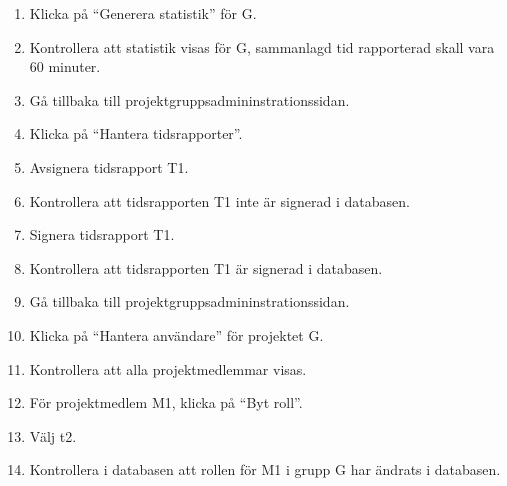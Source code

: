 \documentclass[a4paper]{article}
\begin{document}
\begin{FT}
\begin{enumerate}
\item Klicka på ``Generera statistik'' för G.
\item Kontrollera att statistik visas för G, sammanlagd tid rapporterad skall vara 60 minuter.
\item Gå tillbaka till projektgruppsadmininstrationssidan.
\item Klicka på ``Hantera tidsrapporter''.
\item Avsignera tidsrapport T1.
\item Kontrollera att tidsrapporten T1 inte är signerad i databasen.
\item Signera tidsrapport T1.
\item Kontrollera att tidsrapporten T1 är signerad i databasen.
\item Gå tillbaka till projektgruppsadmininstrationssidan.
\item Klicka på ``Hantera användare'' för projektet G.
\item Kontrollera att alla projektmedlemmar visas.
\item För projektmedlem M1, klicka på ``Byt roll''.
\item Välj t2.
\item Kontrollera i databasen att rollen för M1 i grupp G har ändrats i databasen.
\end{enumerate}
\end{FT}
\end{document}
